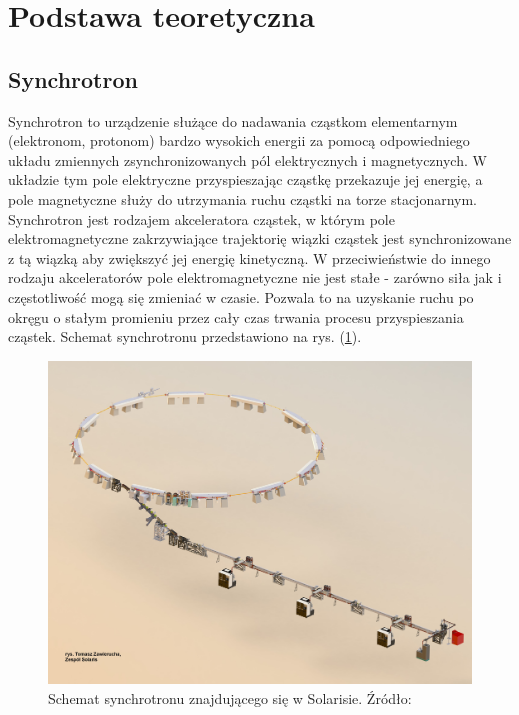 \clearpage
\section{Podstawa teoretyczna}
\label{sec:podstawa}


\subsection{Synchrotron}
	
	\hspace{2em} Synchrotron to urządzenie służące do nadawania cząstkom elementarnym (elektronom, protonom) bardzo wysokich energii za pomocą odpowiedniego układu zmiennych zsynchronizowanych pól elektrycznych i magnetycznych. W układzie tym pole elektryczne przyspieszając cząstkę przekazuje jej energię, a pole magnetyczne służy do utrzymania ruchu cząstki na torze stacjonarnym. 
	Synchrotron jest rodzajem akceleratora cząstek, w którym pole elektromagnetyczne zakrzywiające trajektorię wiązki cząstek jest synchronizowane z tą wiązką aby zwiększyć jej energię kinetyczną. W przeciwieństwie do innego rodzaju akceleratorów pole elektromagnetyczne nie jest stałe - zarówno siła jak i częstotliwość mogą się zmieniać w czasie. Pozwala to na uzyskanie ruchu po okręgu o stałym promieniu przez cały czas trwania procesu przyspieszania cząstek. Schemat synchrotronu przedstawiono na rys. (\ref{fig:schematSynchrotronu}).
	
	\begin{figure}[ht]
		\centering
		\includegraphics[width=0.9\linewidth]{Grafika/solarisMaszyna}
		\caption{Schemat synchrotronu znajdującego się w Solarisie. Źródło: \cite{synchrotron_uj_edu}}
		\label{fig:schematSynchrotronu}
	\end{figure}
	

